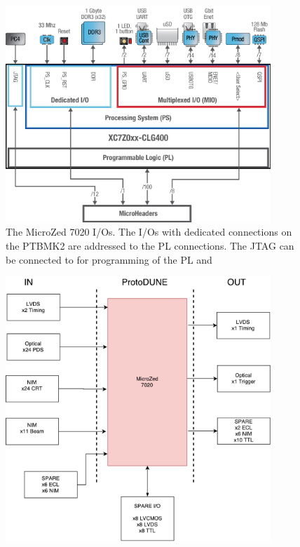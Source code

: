 \documentclass{report}
\begin{document}
 \begin{figure}[H]
     \centering
         \includegraphics[width=100mm]{mz_block_diagram.jpg}
         \caption{The MicroZed 7020 I/Os. The I/Os with dedicated connections on the PTBMK2 are 
                       addressed to the PL connections. The JTAG can be connected to for programming 
                       of the PL and }
 \end{figure}

 
 
 \begin{figure}[H]
     \centering
         \includegraphics[width=100mm]{ptbmk2_protodune_io_firm.pdf}
         \caption{}
 \end{figure} 
\end{document}
